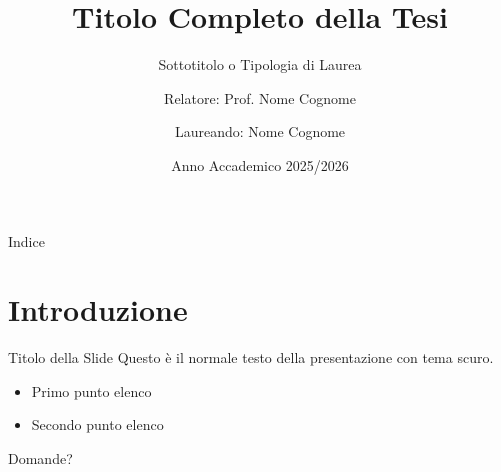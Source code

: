 \documentclass[aspectratio=169]{beamer} %
\title[Titolo Breve per il Footer]{Titolo Completo della Tesi}
\subtitle{Sottotitolo o Tipologia di Laurea}
\author[Cognome]{Relatore: Prof. Nome Cognome \and Laureando: Nome Cognome}
\date{Anno Accademico 2025/2026}
\begin{document}
\begin{frame}
    \titlepage
\end{frame}

\begin{frame}{Indice}
    \tableofcontents
\end{frame}


\section{Introduzione}
\begin{frame}{Titolo della Slide}
    Questo è il normale testo della presentazione con tema scuro.
    \begin{itemize}
        \item Primo punto elenco
        \item Secondo punto elenco
    \end{itemize}
\end{frame}

\begin{emptyframe}
    Domande?
\end{emptyframe}
\end{document}
